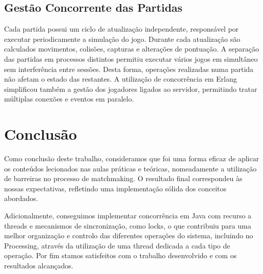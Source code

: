 \documentclass[11pt,a4paper]{article}
\begin{document}
\subsection{Gestão Concorrente das Partidas}
Cada partida possui um ciclo de atualização independente, responsável por executar periodicamente a simulação do jogo. Durante cada atualização são calculados movimentos, colisões, capturas e alterações de pontuação.
A separação das partidas em processos distintos permitiu executar vários jogos em simultâneo sem interferência entre sessões. Desta forma, operações realizadas numa partida não afetam o estado das restantes.
A utilização de concorrência em Erlang simplificou também a gestão dos jogadores ligados ao servidor, permitindo tratar múltiplas conexões e eventos em paralelo.


\newpage
\section{Conclusão}

Como conclusão deste trabalho, consideramos que foi uma forma eficaz de aplicar os conteúdos lecionados nas aulas práticas e teóricas, nomeadamente a utilização de barreiras no processo de matchmaking. O resultado final correspondeu às nossas expectativas, refletindo uma implementação sólida dos conceitos abordados.

Adicionalmente, conseguimos implementar concorrência em Java com recurso a threads e mecanismos de sincronização, como locks, o que contribuiu para uma melhor organização e controlo das diferentes operações do sistema, incluindo no Processing, através da utilização de uma thread dedicada a cada tipo de operação. Por fim stamos satisfeitos com o trabalho desenvolvido e com os resultados alcançados.
\end{document}
